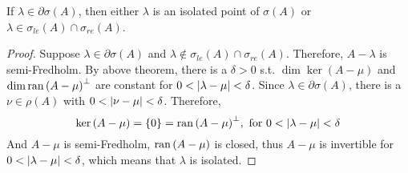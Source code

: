 \begin{thm}
	If $\lambda \in \partial{\sigma(A)}$, then either $\lambda$ is an isolated point of $\sigma(A)$ or $\lambda \in \sigma_{le}(A) \cap \sigma_{re}(A)$.
\end{thm}
\begin{proof}
	Suppose $\lambda \in \partial{\sigma(A)}$ and $\lambda \notin \sigma_{le}(A) \cap \sigma_{re}(A)$. Therefore, $A-\lambda$ is semi-Fredholm. By above theorem, there is a $\delta > 0$ s.t. $\dim{\ker{(A - \mu)}}$ and $\dim{\operatorname{ran}{(A - \mu)}^{\bot}}$ are constant for $0< \left\lvert\lambda - \mu\right\lvert < \delta$. Since $\lambda \in \partial{\sigma(A)}$, there is a $\nu \in \rho(A)$ with $0< \left\lvert\nu - \mu\right\lvert < \delta$. Therefore,
	\begin{equation*}
		\ker{(A-\mu)} = \{0\} = \operatorname{ran}{(A-\mu)}^{\bot}, \text{ for } 0 < \left\lvert\lambda - \mu\right\lvert < \delta
	\end{equation*}
	And $A-\mu$ is semi-Fredholm, $\operatorname{ran}{(A-\mu)}$ is closed, thus $A-\mu$ is invertible for $0 < \left\lvert\lambda - \mu\right\lvert < \delta$, which means that $\lambda$ is isolated.
\end{proof}

